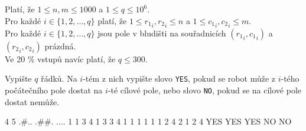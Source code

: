 \bigskip
\noindent
Platí, že $1 \leq n,m \leq 1000$ a $1 \leq q \leq 10^6$.\\
Pro každé $i \in \{ 1, 2, \ldots, q \}$ platí, že
  $1 \leq {r_1}_i, {r_2}_i \leq n$ a $1 \leq {c_1}_i, {c_2}_i \leq m$.\\
Pro každé $i \in \{ 1, 2, \ldots, q \}$ jsou pole v bludišti na souřadnicích
  $({r_1}_i, {c_1}_i)$ a $({r_2}_i, {c_2}_i)$ prázdná.\\
Ve 20 \% vstupů navíc platí, že $q \leq 300$.


Vypište $q$ řádků. Na $i$-tém z nich vypište slovo \texttt{YES}, pokud se robot
může z $i$-tého počátečního pole dostat na $i$-té cílové pole, nebo slovo
\texttt{NO}, pokud se na cílové pole dostat nemůže.


 4 5
.\#..
.\#\#.
....
1 1 3 4
1 3 3 4
1 1 1 1
1 1 2 4
2 1 2 4
\sampleOUT
YES
YES
YES
NO
NO
\sampleEND


